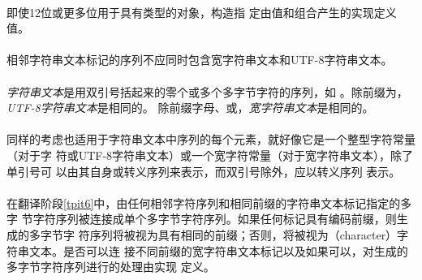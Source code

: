 \paragraph{}
\ex 即使12位或更多位用于具有类型的对象，构造指
定由值和\tm{\sq 4\sq}组合产生的实现定义值。


\syntax
\paragraph{}

\constraint
\paragraph{}
相邻字符串文本标记的序列不应同时包含宽字符串文本和UTF-8字符串文本。

\desc
\paragraph{}
\textit{字符串文本}是用双引号括起来的零个或多个多字节字符的序列，如
。除前缀为，\textit{UTF-8字符串文本}是相同的。
除前缀字母、或，\textit{宽字符串文本}是相同的。

\paragraph{}
同样的考虑也适用于字符串文本中序列的每个元素，就好像它是一个整型字符常量（对于字
符或UTF-8字符串文本）或一个宽字符常量（对于宽字符串文本），除了单引号\tm{\sq}可
以由其自身或转义序列\tm{\bs\sq}来表示，而双引号\tm{\dq}除外，应以转义序列
\tm{\bs\dq}表示。

\semantic
\paragraph{}
在翻译阶段\ref{tpit6}中，由任何相邻字符序列和相同前缀的字符串文本标记指定的多字
节字符序列被连接成单个多字节字符序列。如果任何标记具有编码前缀，则生成的多字节字
符序列将被视为具有相同的前缀；否则，将被视为（character）字符串文本。是否可以连
接不同前缀的宽字符串文本标记以及如果可以，对生成的多字节字符序列进行的处理由实现
定义。

